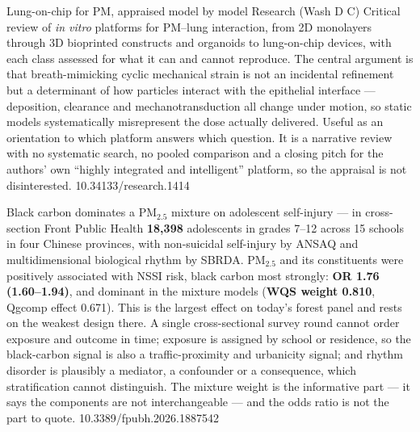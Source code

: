 \documentclass[10pt]{article}
\begin{document}
{Lung-on-chip for PM, appraised model by model}
{Research (Wash D C)}
{Critical review of \emph{in vitro} platforms for PM--lung interaction, from 2D monolayers
through 3D bioprinted constructs and organoids to lung-on-chip devices, with each class
assessed for what it can and cannot reproduce. The central argument is that
breath-mimicking cyclic mechanical strain is not an incidental refinement but a determinant
of how particles interact with the epithelial interface --- deposition, clearance and
mechanotransduction all change under motion, so static models systematically misrepresent
the dose actually delivered. Useful as an orientation to which platform answers which
question. It is a narrative review with no systematic search, no pooled comparison and a
closing pitch for the authors' own ``highly integrated and intelligent'' platform, so the
appraisal is not disinterested.}
{10.34133/research.1414}


{Black carbon dominates a PM$_{2.5}$ mixture on adolescent self-injury --- in cross-section}
{Front Public Health}
{\textbf{18{,}398} adolescents in grades 7--12 across 15 schools in four Chinese provinces,
with non-suicidal self-injury by ANSAQ and multidimensional biological rhythm by SBRDA.
PM$_{2.5}$ and its constituents were positively associated with NSSI risk, black carbon
most strongly: \textbf{OR 1.76 (1.60--1.94)}, and dominant in the mixture models
(\textbf{WQS weight 0.810}, Qgcomp effect 0.671). This is the largest effect on today's
forest panel and rests on the weakest design there. A single cross-sectional survey round
cannot order exposure and outcome in time; exposure is assigned by school or residence, so
the black-carbon signal is also a traffic-proximity and urbanicity signal; and rhythm
disorder is plausibly a mediator, a confounder or a consequence, which stratification
cannot distinguish. The mixture weight is the informative part --- it says the components
are not interchangeable --- and the odds ratio is not the part to quote.}
{10.3389/fpubh.2026.1887542}

\end{document}
